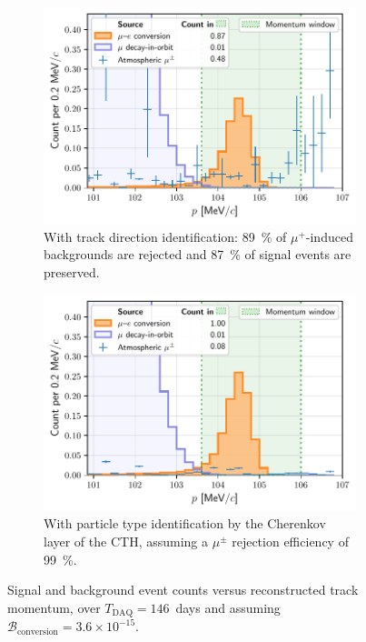 \begin{figure}
    \centering
    \begin{subfigure}{0.48\textwidth}
        \centering
        \includegraphics[width=\textwidth]{chapter6/thesis_conversion_search_momentum_distribution_withcuts_with_mu+_ID_dp=0.1_v3.pdf}
        \caption{With track direction identification: \SI{89}{\percent} of
        $\mu^+$-induced backgrounds are rejected and \SI{87}{\percent} of signal events
        are preserved.}
        \label{fig:spectrum_with_direction_id}
    \end{subfigure}
    \hfill
    \begin{subfigure}{0.48\textwidth}
        \centering
        \includegraphics[width=\textwidth]{chapter6/thesis_conversion_search_momentum_distribution_withcuts_with_mu+-.pdf}
        \caption{With particle type identification by the Cherenkov layer of the
        CTH, assuming a $\mu^{\pm}$ rejection efficiency of \SI{99}{\percent}.}
        \label{fig:spectrum_with_cherenkov_pid}
    \end{subfigure}
        
    \caption{Signal and background event counts versus reconstructed track
    momentum, over $T_\mathrm{DAQ}=146$~days and assuming
    $\mathcal{B}_\mathrm{conversion} = 3.6\times 10^{-15}$. }
    \label{fig:lin_spectra}
\end{figure}


